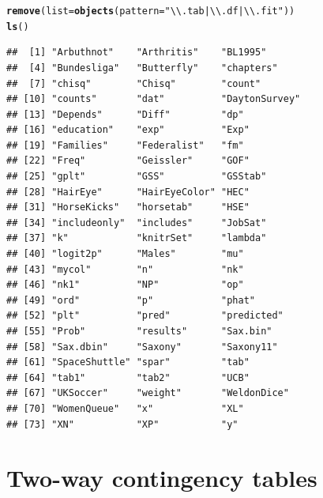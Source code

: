 \documentclass[11pt]{book}\usepackage[]{graphicx}\usepackage[]{color}
\makeatletter
\newcommand{\hlstr}[1]{\textcolor[rgb]{0.192,0.494,0.8}{#1}}%
\newcommand{\hlstd}[1]{\textcolor[rgb]{0.345,0.345,0.345}{#1}}%
\newcommand{\hlkwc}[1]{\textcolor[rgb]{0.333,0.667,0.333}{#1}}%
\newcommand{\hlkwd}[1]{\textcolor[rgb]{0.737,0.353,0.396}{\textbf{#1}}}%
\newenvironment{kframe}{%
 \def\at@end@of@kframe{}%
 \ifinner\ifhmode%
  \def\at@end@of@kframe{\end{minipage}}%
  \begin{minipage}{\columnwidth}%
 \fi\fi%
 \def\FrameCommand##1{\hskip\@totalleftmargin \hskip-\fboxsep
 \colorbox{shadecolor}{##1}\hskip-\fboxsep
     \hskip-\linewidth \hskip-\@totalleftmargin \hskip\columnwidth}%
 \MakeFramed {\advance\hsize-\width
   \@totalleftmargin\z@ \linewidth\hsize
   \@setminipage}}%
 {\par\unskip\endMakeFramed%
 \at@end@of@kframe}
\newenvironment{knitrout}{}{} %
\renewenvironment{knitrout}{\small\renewcommand{\baselinestretch}{.85}}{} %
\makeatother
\begin{document}
\begin{knitrout}
\color{fgcolor}\begin{kframe}
\begin{alltt}
\hlkwd{remove}\hlstd{(}\hlkwc{list}\hlstd{=}\hlkwd{objects}\hlstd{(}\hlkwc{pattern}\hlstd{=}\hlstr{"\textbackslash{}\textbackslash{}.tab|\textbackslash{}\textbackslash{}.df|\textbackslash{}\textbackslash{}.fit"}\hlstd{))}
\hlkwd{ls}\hlstd{()}
\end{alltt}
\begin{verbatim}
##  [1] "Arbuthnot"    "Arthritis"    "BL1995"      
##  [4] "Bundesliga"   "Butterfly"    "chapters"    
##  [7] "chisq"        "Chisq"        "count"       
## [10] "counts"       "dat"          "DaytonSurvey"
## [13] "Depends"      "Diff"         "dp"          
## [16] "education"    "exp"          "Exp"         
## [19] "Families"     "Federalist"   "fm"          
## [22] "Freq"         "Geissler"     "GOF"         
## [25] "gplt"         "GSS"          "GSStab"      
## [28] "HairEye"      "HairEyeColor" "HEC"         
## [31] "HorseKicks"   "horsetab"     "HSE"         
## [34] "includeonly"  "includes"     "JobSat"      
## [37] "k"            "knitrSet"     "lambda"      
## [40] "logit2p"      "Males"        "mu"          
## [43] "mycol"        "n"            "nk"          
## [46] "nk1"          "NP"           "op"          
## [49] "ord"          "p"            "phat"        
## [52] "plt"          "pred"         "predicted"   
## [55] "Prob"         "results"      "Sax.bin"     
## [58] "Sax.dbin"     "Saxony"       "Saxony11"    
## [61] "SpaceShuttle" "spar"         "tab"         
## [64] "tab1"         "tab2"         "UCB"         
## [67] "UKSoccer"     "weight"       "WeldonDice"  
## [70] "WomenQueue"   "x"            "XL"          
## [73] "XN"           "XP"           "y"
\end{verbatim}
\end{kframe}
\end{knitrout}








\chapter{Two-way contingency tables}\label{ch:twoway}
\end{document}
